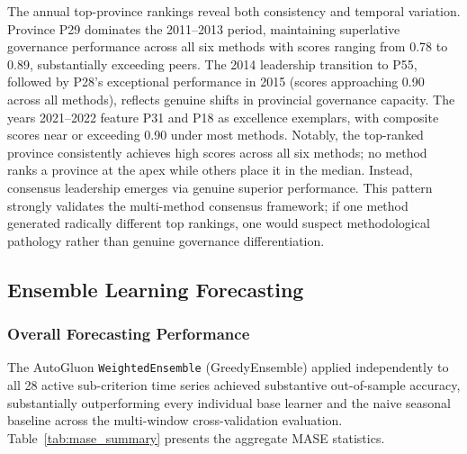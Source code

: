 \documentclass[12pt,a4paper]{article}
\begin{document}
The annual top-province rankings reveal both consistency and temporal variation. Province P29 dominates the 2011--2013 period, maintaining superlative governance performance across all six methods with scores ranging from 0.78 to 0.89, substantially exceeding peers. The 2014 leadership transition to P55, followed by P28's exceptional performance in 2015 (scores approaching 0.90 across all methods), reflects genuine shifts in provincial governance capacity. The years 2021--2022 feature P31 and P18 as excellence exemplars, with composite scores near or exceeding 0.90 under most methods. Notably, the top-ranked province consistently achieves high scores across all six methods; no method ranks a province at the apex while others place it in the median. Instead, consensus leadership emerges via genuine superior performance. This pattern strongly validates the multi-method consensus framework; if one method generated radically different top rankings, one would suspect methodological pathology rather than genuine governance differentiation.

\subsection{Ensemble Learning Forecasting}
\label{subsec:results_forecast}

\subsubsection{Overall Forecasting Performance}

The AutoGluon \texttt{WeightedEnsemble} (GreedyEnsemble) applied independently to all 28 active sub-criterion time series achieved substantive out-of-sample accuracy, substantially outperforming every individual base learner and the naive seasonal baseline across the multi-window cross-validation evaluation. Table~\ref{tab:mase_summary} presents the aggregate MASE statistics.
\end{document}
